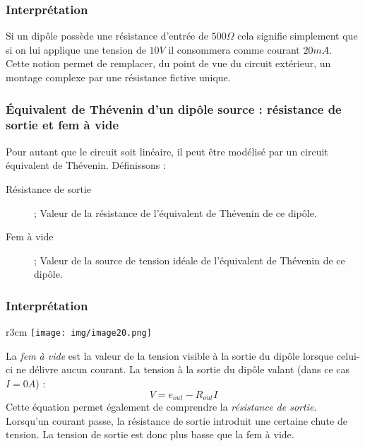 \subsubsection{Interprétation}
Si un dipôle possède une résistance d'entrée de $500\Omega$ cela signifie simplement que si on lui applique une tension de $10V$ il consommera comme courant $20 mA$.\\

Cette notion permet de remplacer, du point de vue du circuit extérieur, un montage complexe par une résistance fictive unique.

\subsubsection{Équivalent de Thévenin d'un dipôle source : résistance de sortie et fem à vide}
Pour autant que le circuit soit linéaire, il peut être modélisé par un circuit équivalent de Thévenin. Définissons :
\begin{description}
\item[Résistance de sortie] ; Valeur de la résistance de l'équivalent de Thévenin de ce dipôle.
\item[Fem à vide] ; Valeur de la source de tension idéale de l'équivalent de Thévenin de ce dipôle.
\end{description}

\subsubsection{Interprétation}
\begin{wrapfigure}[8]{r}{3cm}
\texttt{[image: img/image20.png]}
\end{wrapfigure}
La \textit{fem à vide} est la valeur de la tension visible à la sortie du dipôle lorsque celui-ci ne délivre aucun courant. La tension à la sortie du dipôle valant (dans ce cas $I = 0A$) :
\begin{equation}
V = e_{out} - R_{out}I
\end{equation}
Cette équation permet également de comprendre la \textit{résistance de sortie}. Lorsqu'un courant passe, la résistance de sortie introduit une certaine chute de tension. La tension de sortie est donc plus basse que la fem à vide.\\




